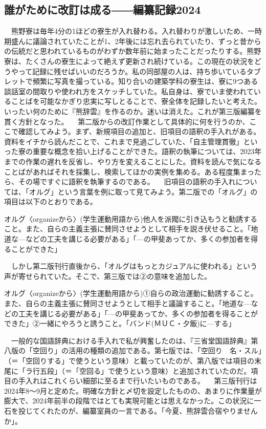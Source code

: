 \subsection{誰がために改訂は成る――編纂記録2024}


　熊野寮は毎年4分の1ほどの寮生が入れ替わる。入れ替わりが激しいため、一時期盛んに議論されていたことが1、2年後には忘れ去られていたり、ずっと昔からの伝統だと思われているものがわずか数年前に始まったことだったりする。熊野寮は、たくさんの寮生によって絶えず更新され続けている。この現在の状況をどうやって記録に残せばいいのだろうか。私の同部屋の人は、持ち歩いているタブレットで頻繁に写真を撮っている。知り合いの建築学科の寮生は、寮に9つある談話室の間取りや使われ方をスケッチしていた。私自身は、寮でいま使われていることばを可能なかぎり忠実に写しとることで、寮全体を記録したいと考えた。いったい何のために『熊辞雲』を作るのか。迷いは消えた。これが第三版編纂を貫く方針となった。
　第二版からの改訂作業として具体的に何を行うのか、ここで確認してみよう。まず、新規項目の追加と、旧項目の語釈の手入れがある。資料をイチから読んだことで、これまで見過ごしていた、「自主管理貫徹」といった寮の重要な概念を拾い上げることができた。語釈の執筆については、2023年までの作業の遅れを反省し、やり方を変えることにした。資料を読んで気になることばがあればそれを採集し、検索してほかの実例を集める。ある程度集まったら、その場ですぐに語釈を執筆するのである。
　旧項目の語釈の手入れについては、「オルグ」という言葉を例に取って見てみよう。第二版での「オルグ」の項目は以下のとおりである。
 
オルグ〈organizeから〉(学生運動用語から)他人を派閥に引き込もうと勧誘すること。また、自らの主義主張に賛同させようとして相手を説き伏せること。「地道な—などの工夫を講じる必要がある」「—の甲斐あってか、多くの参加者を得ることができた」
 
　しかし第二版刊行直後から、「オルグはもっとカジュアルに使われる」という声が寄せられていた。そこで、第三版では②の意味を追加した。
 
オルグ〈organizeから〉(学生運動用語から)①自らの政治運動に勧誘すること。また、自らの主義主張に賛同させようとして相手と議論すること。「地道な—などの工夫を講じる必要がある」「—の甲斐あってか、多くの参加者を得ることができた」②一緒にやろうと誘うこと。「バンド(ＭＵＣ・夕飯)に—する」
 
　一般的な国語辞典における手入れで私が興奮したのは、『三省堂国語辞典』第八版の「空回り」の活用の種類の追加である。第七版では、「空回り　名・スル」（＝「空回りする」で使うという意味）と載っていたのが、第八版では項目の末尾に「ラ行五段」（＝「空回る」で使うという意味）と追加されていたのだ。項目の手入れはこれくらい細部に至るまで行いたいものである。
　第三版刊行は2024年8〜9月と定めた。明確な方針と〆切を設定したものの、あまりに作業量が膨大で、2024年前半の段階ではとても実現可能とは思えなかった。この状況に一石を投じてくれたのが、編纂室員の一言である。「今夏、熊辞雲合宿やりませんか」。



